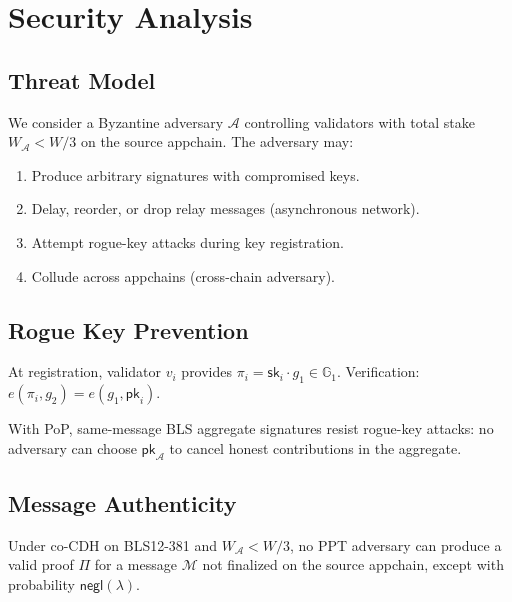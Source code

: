 \section{Security Analysis}
\label{sec:security}

\subsection{Threat Model}

We consider a Byzantine adversary $\mathcal{A}$ controlling validators with total stake $W_{\mathcal{A}} < W/3$ on the source appchain. The adversary may:
\begin{enumerate}
    \item Produce arbitrary signatures with compromised keys.
    \item Delay, reorder, or drop relay messages (asynchronous network).
    \item Attempt rogue-key attacks during key registration.
    \item Collude across appchains (cross-chain adversary).
\end{enumerate}

\subsection{Rogue Key Prevention}

\begin{definition}
At registration, validator $v_i$ provides $\pi_i = \mathsf{sk}_i \cdot g_1 \in \mathbb{G}_1$. Verification: $e(\pi_i, g_2) = e(g_1, \mathsf{pk}_i)$.
\end{definition}

\begin{lemma}
With PoP, same-message BLS aggregate signatures resist rogue-key attacks: no adversary can choose $\mathsf{pk}_{\mathcal{A}}$ to cancel honest contributions in the aggregate.
\end{lemma}

\subsection{Message Authenticity}

\begin{theorem}[Authenticity]\label{thm:auth}
Under co-CDH on BLS12-381 and $W_{\mathcal{A}} < W/3$, no PPT adversary can produce a valid proof $\Pi$ for a message $\mathcal{M}$ not finalized on the source appchain, except with probability $\mathsf{negl}(\lambda)$.
\end{theorem}

